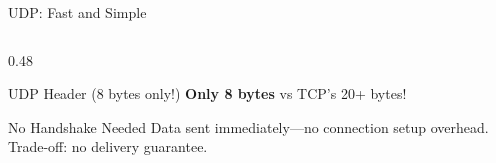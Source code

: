 \documentclass[aspectratio=169, 11pt]{beamer}
\begin{document}
\begin{frame}{UDP: Fast and Simple}
\begin{columns}[T]
\begin{column}{0.48\textwidth}
\begin{block}{UDP Header (8 bytes only!)}
                \vspace{0.2em}
                \footnotesize
                \textcolor{udpgreen}{\textbf{Only 8 bytes}} vs TCP's 20+ bytes!
            \end{block}
            
            \vspace{0.3em}
            \begin{alertblock}{No Handshake Needed}
                \small
                Data sent immediately---no connection setup overhead. Trade-off: no delivery guarantee.
            \end{alertblock}
        \end{column}
    \end{columns}
\end{frame}

\end{document}
